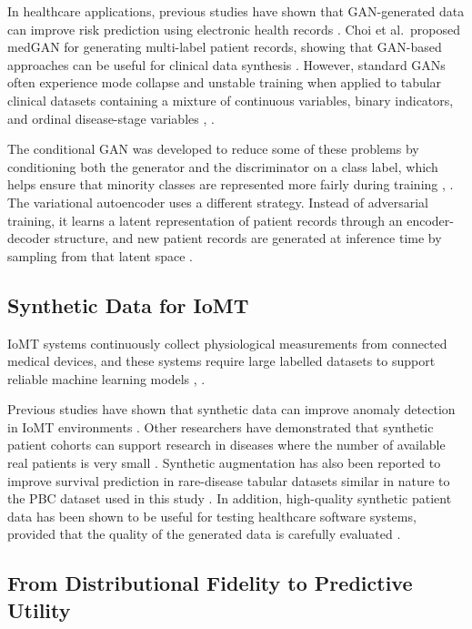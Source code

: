 \documentclass[journal]{IEEEtran}
\begin{document}
In healthcare applications, previous studies have shown that GAN-generated data can improve risk prediction using electronic health records \cite{che2017}. Choi et al.\ proposed medGAN for generating multi-label patient records, showing that GAN-based approaches can be useful for clinical data synthesis \cite{choi2017}. However, standard GANs often experience mode collapse and unstable training when applied to tabular clinical datasets containing a mixture of continuous variables, binary indicators, and ordinal disease-stage variables \cite{lenz2021}, \cite{espinosa2023}.

The conditional GAN was developed to reduce some of these problems by conditioning both the generator and the discriminator on a class label, which helps ensure that minority classes are represented more fairly during training \cite{vega2020}, \cite{sharma2024}. The variational autoencoder uses a different strategy. Instead of adversarial training, it learns a latent representation of patient records through an encoder-decoder structure, and new patient records are generated at inference time by sampling from that latent space \cite{nikolentzos2023}.

\subsection{Synthetic Data for IoMT}

IoMT systems continuously collect physiological measurements from connected medical devices, and these systems require large labelled datasets to support reliable machine learning models \cite{guo2021}, \cite{obeid2023}.

Previous studies have shown that synthetic data can improve anomaly detection in IoMT environments \cite{meidan2018}. Other researchers have demonstrated that synthetic patient cohorts can support research in diseases where the number of available real patients is very small \cite{damico2023}. Synthetic augmentation has also been reported to improve survival prediction in rare-disease tabular datasets similar in nature to the PBC dataset used in this study \cite{kim2024}. In addition, high-quality synthetic patient data has been shown to be useful for testing healthcare software systems, provided that the quality of the generated data is carefully evaluated \cite{tucker2020}.

\subsection{From Distributional Fidelity to Predictive Utility}
\end{document}
